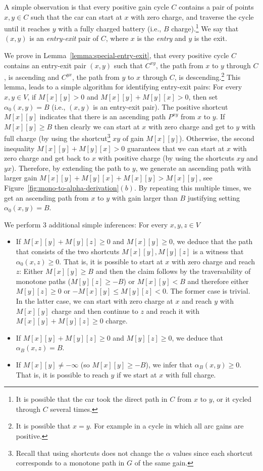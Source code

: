 \documentclass[11pt]{article}
\begin{document}
A simple observation is that every positive gain cycle $C$ contains a pair of points $x,y\in C$ such that the car can start at $x$ with zero charge, and traverse the cycle until it reaches $y$ with a fully charged battery (i.e., $B$ charge).\footnote{It is possible that the car took the direct path in $C$ from $x$ to $y$, or it cycled through $C$ several times.} We say that $(x,y)$ is an \emph{entry-exit} pair of $C$, where $x$ is the \emph{entry} and $y$ is the exit.

We prove in Lemma~\ref{lemma:special-entry-exit}, that every positive cycle $C$ contains an entry-exit pair $(x,y)$ such that $C^{xy}$, the path from $x$ to $y$ through $C$, is ascending and $C^{yx}$, the path from $y$ to $x$ through $C$, is descending.\footnote{It is possible that $x=y$. For example in a cycle in which all arc gains are positive.} This lemma, leads to a simple algorithm for identifying entry-exit pairs: For every $x,y\in V$, if $M[x][y]>0$ and $M[x][y] + M[y][x] > 0$, then set $\alpha_0(x,y)=B$ (i.e., $(x,y)$ is an entry-exit pair).
The positive shortcut $M[x][y]$ indicates that there is an ascending path $P^{xy}$ from $x$ to $y$.
If $M[x][y]\ge B$ then clearly we can start at $x$ with zero charge and get to $y$ with full charge (by using the shortcut\footnote{Recall that using shortcuts does not change the $\alpha$ values since each shortcut corresponds to a monotone path in $G$ of the same gain.} $xy$ of gain $M[x][y]$). Otherwise, the second inequality $M[x][y] + M[y][x] > 0$ guarantees that we can start at $x$ with zero charge and get back to $x$ with positive charge (by using the shortcuts $xy$ and $yx$).
Therefore, by extending the path  to $y$, we generate an ascending path with larger gain $M[x][y]+M[y][x] + M[x][y] > M[x][y]$, see Figure~\ref{fig:mono-to-alpha-derivation}$(b)$. By repeating this multiple times, we get an ascending path from $x$ to $y$ with gain larger than $B$ justifying setting
$\alpha_0(x,y)=B$.

We perform $3$ additional simple inferences: For every $x,y,z\in V$

\begin{itemize}
    \item If $M[x][y] + M[y][z] \ge 0$ and $M[x][y] \ge 0$, we deduce that the path that consists of the two shortcuts $M[x][y],M[y][z]$ is a witness that $\alpha_0(x,z) \ge 0$. That is, it is possible to start at $x$ with zero charge and reach $z$: Either $M[x][y]\ge B$ and then the claim follows by the traversability of monotone paths ($M[y][z]\ge -B$) or $M[x][y] < B$ and therefore either  $M[y][z] \ge 0$ or $- M[x][y] \le M[y][z] < 0$. The former case is trivial. In the latter case, we can start with zero charge at $x$ and reach $y$ with $M[x][y]$ charge and then continue to $z$ and reach it with $M[x][y] + M[y][z] \ge 0$ charge.  
    \item If $M[x][y] + M[y][z]\ge 0$ and $M[y][z] \ge 0$, we deduce that $\alpha_B(x,z) = B$.
    \item If $M[x][y] \neq -\infty$ (so $M[x][y]\ge -B$), we infer that $\alpha_B(x,y) \ge 0$. That is, it is possible to reach $y$ if we start at $x$ with full charge.
\end{itemize}
\end{document}
